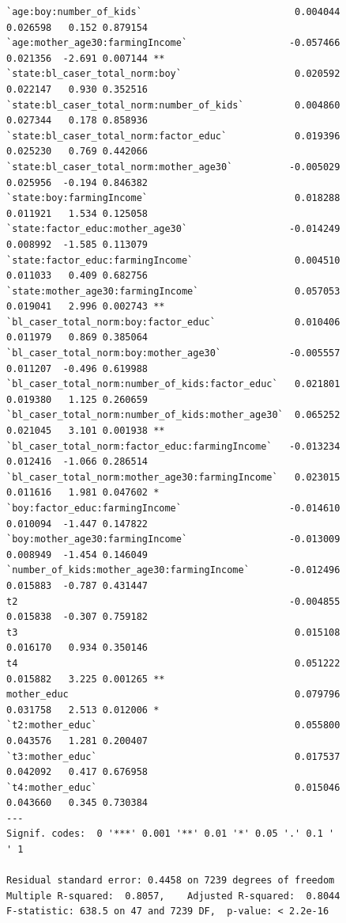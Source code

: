 \documentclass{article}
\begin{document}
\begin{figure}[H]
\begin{lstlisting}[style=RstyleCommentSmall, caption=CATE with Controls selected by LASSO]
`age:boy:number_of_kids`                           0.004044   0.026598   0.152 0.879154    
`age:mother_age30:farmingIncome`                  -0.057466   0.021356  -2.691 0.007144 ** 
`state:bl_caser_total_norm:boy`                    0.020592   0.022147   0.930 0.352516    
`state:bl_caser_total_norm:number_of_kids`         0.004860   0.027344   0.178 0.858936    
`state:bl_caser_total_norm:factor_educ`            0.019396   0.025230   0.769 0.442066    
`state:bl_caser_total_norm:mother_age30`          -0.005029   0.025956  -0.194 0.846382    
`state:boy:farmingIncome`                          0.018288   0.011921   1.534 0.125058    
`state:factor_educ:mother_age30`                  -0.014249   0.008992  -1.585 0.113079    
`state:factor_educ:farmingIncome`                  0.004510   0.011033   0.409 0.682756    
`state:mother_age30:farmingIncome`                 0.057053   0.019041   2.996 0.002743 ** 
`bl_caser_total_norm:boy:factor_educ`              0.010406   0.011979   0.869 0.385064    
`bl_caser_total_norm:boy:mother_age30`            -0.005557   0.011207  -0.496 0.619988    
`bl_caser_total_norm:number_of_kids:factor_educ`   0.021801   0.019380   1.125 0.260659    
`bl_caser_total_norm:number_of_kids:mother_age30`  0.065252   0.021045   3.101 0.001938 ** 
`bl_caser_total_norm:factor_educ:farmingIncome`   -0.013234   0.012416  -1.066 0.286514    
`bl_caser_total_norm:mother_age30:farmingIncome`   0.023015   0.011616   1.981 0.047602 *  
`boy:factor_educ:farmingIncome`                   -0.014610   0.010094  -1.447 0.147822    
`boy:mother_age30:farmingIncome`                  -0.013009   0.008949  -1.454 0.146049    
`number_of_kids:mother_age30:farmingIncome`       -0.012496   0.015883  -0.787 0.431447    
t2                                                -0.004855   0.015838  -0.307 0.759182    
t3                                                 0.015108   0.016170   0.934 0.350146    
t4                                                 0.051222   0.015882   3.225 0.001265 ** 
mother_educ                                        0.079796   0.031758   2.513 0.012006 *  
`t2:mother_educ`                                   0.055800   0.043576   1.281 0.200407    
`t3:mother_educ`                                   0.017537   0.042092   0.417 0.676958    
`t4:mother_educ`                                   0.015046   0.043660   0.345 0.730384    
---
Signif. codes:  0 '***' 0.001 '**' 0.01 '*' 0.05 '.' 0.1 ' ' 1

Residual standard error: 0.4458 on 7239 degrees of freedom
Multiple R-squared:  0.8057,	Adjusted R-squared:  0.8044 
F-statistic: 638.5 on 47 and 7239 DF,  p-value: < 2.2e-16
\end{lstlisting}
\end{figure}
\end{document}
